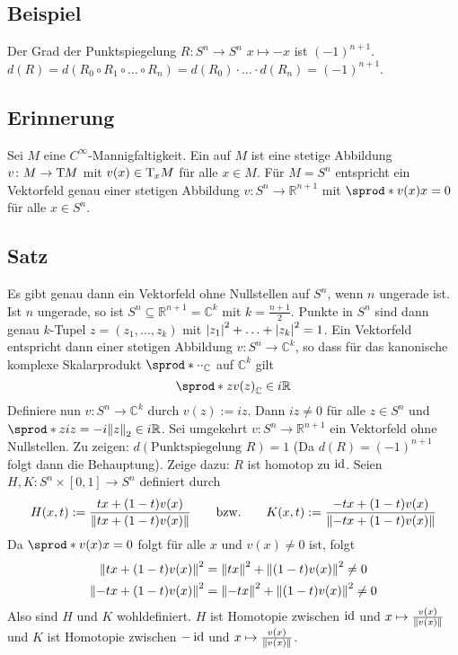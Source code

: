 \subsection[Beispiel: Grad der Punktspiegelung]{Beispiel} %
\label{sub:106}
Der Grad der Punktspiegelung $R \colon S^n \to S^n$ $x  \mapsto -x$ ist $(-1)^{n+1}$.
$d(R)= d(R_0 \circ R_1 \circ \ldots \circ R_n) = d(R_0) \cdot \ldots \cdot d(R_n)= (-1)^{n+1}$. \bewende

\subsection[Erinnerung: Vektorfelder]{Erinnerung} %
\label{sub:107}
Sei $M$ eine $C^\infty$-Mannigfaltigkeit. Ein  auf $M$ ist eine stetige Abbildung $v \colon M \to \Tmap M$ mit $v(x) \in \Tmap_x M$ für alle $x \in M$.
Für $M=S^n$ entspricht ein Vektorfeld genau einer stetigen Abbildung $v \colon S^n \to \mathds{R}^{n+1}$ mit $\sprod*{v(x)}{x} =0$ für alle $x \in S^n$.

\subsection[Satz: Es gibt ein Vektorfeld ohne Nullstellen auf $S^n \iff n$ ist ungerade]{Satz} %
\label{sub:108}
Es gibt genau dann ein Vektorfeld ohne Nullstellen auf $S^n$, wenn $n$ ungerade ist.
Ist $n$ ungerade, so ist $S^{n} \subseteq \mathds{R}^{n+1} = \mathds{C}^{k}$ mit $k=\frac{n+1}{2}$. Punkte in $S^n$ sind dann genau $k$-Tupel $z=(z_1, \ldots , z_k)$ mit
$\abs*{z_1}^2 + \ldots + \abs*{z_k}^2 = 1$. Ein Vektorfeld entspricht dann einer stetigen Abbildung $v \colon S^n \to \mathds{C}^k$, so dass für das kanonische komplexe 
Skalarprodukt $\sprod*{\cdot }{\cdot}_\mathds{C} $ auf $\mathds{C}^k$ gilt
\[
	\sprod*{z}{v(z)}_\mathds{C} \in i \mathds{R} 
\]
Definiere nun $v \colon S^n \to \mathds{C}^k$ durch $v(z) := i z$. Dann $i z\not= 0$ für alle $z \in S^n$ und $\sprod*{z}{i z}= -i \norm[2]{z} \in i \mathds{R}$. Sei 
umgekehrt $v \colon S^n \to \mathds{R}^{n+1}$ ein Vektorfeld ohne Nullstellen. Zu zeigen: $d( \text{Punktspiegelung }R)=1$ (Da $d(R)=(-1)^{n+1}$ folgt dann die Behauptung).
Zeige dazu: $R$ ist homotop zu $\id$. Seien $H, K \colon S^n \times [0,1] \to S^n$ definiert durch 
\[
	H(x,t) := \frac{t x + (1-t)v(x)}{\norm{tx + (1-t)v(x)} } \qquad \text{bzw.}\qquad K(x,t) :=  \frac{-t x + (1-t)v(x)}{\norm{-tx + (1-t)v(x)}}
\]
Da $\sprod*{v(x)}{x}=0$ folgt für alle $x$ und $v(x)\not=0$ ist, folgt 
\begin{align*}
	\norm{t x + (1-t)v(x)}^2 &= \norm{tx}^2 + \norm{(1-t)v(x)}^2 \not=0   \\
	\norm{-t x + (1-t)v(x)}^2 &= \norm{-tx}^2 + \norm{(1-t)v(x)}^2 \not=0
\end{align*}
Also sind $H$ und $K$ wohldefiniert. $H$ ist Homotopie zwischen $\id$ und $x \mapsto \frac{v(x)}{\norm{v(x)} } $ und $K$ ist Homotopie zwischen $-\id$ und 
$x \mapsto \frac{v(x)}{\norm{v(x)} } $. \bewende

